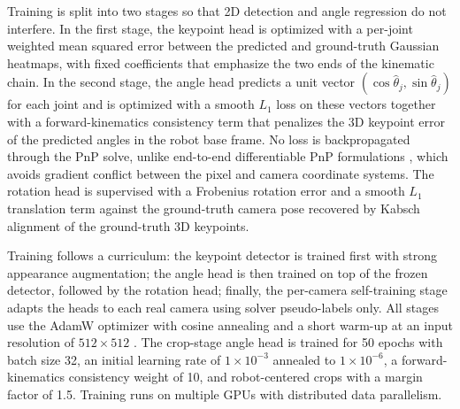 Training is split into two stages so that 2D detection and angle regression do not interfere. In the first stage, the keypoint head is optimized with a per-joint weighted mean squared error between the predicted and ground-truth Gaussian heatmaps, with fixed coefficients that emphasize the two ends of the kinematic chain. In the second stage, the angle head predicts a unit vector $(\cos\hat{\theta}_j, \sin\hat{\theta}_j)$ for each joint and is optimized with a smooth $L_1$ loss on these vectors together with a forward-kinematics consistency term that penalizes the 3D keypoint error of the predicted angles in the robot base frame. No loss is backpropagated through the PnP solve, unlike end-to-end differentiable PnP formulations \cite{chen2020end}, which avoids gradient conflict between the pixel and camera coordinate systems. The rotation head is supervised with a Frobenius rotation error and a smooth $L_1$ translation term against the ground-truth camera pose recovered by Kabsch alignment \cite{kabsch1976solution} of the ground-truth 3D keypoints.

Training follows a curriculum: the keypoint detector is trained first with strong appearance augmentation; the angle head is then trained on top of the frozen detector, followed by the rotation head; finally, the per-camera self-training stage adapts the heads to each real camera using solver pseudo-labels only. All stages use the AdamW optimizer with cosine annealing and a short warm-up at an input resolution of $512\times512$ \cite{loshchilov2017decoupled}. The crop-stage angle head is trained for 50 epochs with batch size 32, an initial learning rate of $1\times10^{-3}$ annealed to $1\times10^{-6}$, a forward-kinematics consistency weight of 10, and robot-centered crops with a margin factor of 1.5. Training runs on multiple GPUs with distributed data parallelism.




